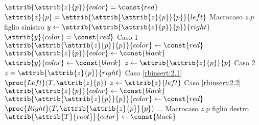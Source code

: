 \begin{codebox}
\li \While $\attrib{\attrib{z}{p}}{color} = \const{red}$
\li \Do
        \If $\attrib{z}{p} = \attrib{\attrib{\attrib{z}{p}}{p}}{left}$
        \Comment Macrocaso $z.p$ figlio sinistro
\li     \Then
            $y \gets \attrib{\attrib{\attrib{z}{p}}{p}}{right}$
\li         \If $\attrib{y}{color} = \const{red}$ \Comment Caso 1
\li         \Then
                $\attrib{\attrib{\attrib{z}{p}}{p}}{color} \gets \const{red}$
\li             $\attrib{\attrib{z}{p}}{color} \gets \const{black}$
\li             $\attrib{y}{color} \gets \const{black}$
\li             $z \gets \attrib{\attrib{z}{p}}{p}$
\li         \Else \Comment Caso 2
\li             \If $z = \attrib{\attrib{z}{p}}{right}$ \Comment Caso \ref{rbinsert:2.1}
\li             \Then
                    $\proc{Left}(T,\attrib{z}{p})$
\li                 $z \gets \attrib{z}{left}$
                \End
\zi             \Comment Caso \ref{rbinsert:2.2}
\li             $\attrib{\attrib{z}{p}}{color} \gets \const{black}$
\li             $\attrib{\attrib{\attrib{z}{p}}{p}}{color} \gets \const{red}$
\li             $\proc{Right}(T,\attrib{\attrib{z}{p}}{p})$
            \End
\li     \Else $\dots$ \Comment Macrocaso $z.p$ figlio destro
        \End
    \End
\li $\attrib{\attrib{T}{root}}{color} \gets \const{black}$
\end{codebox}